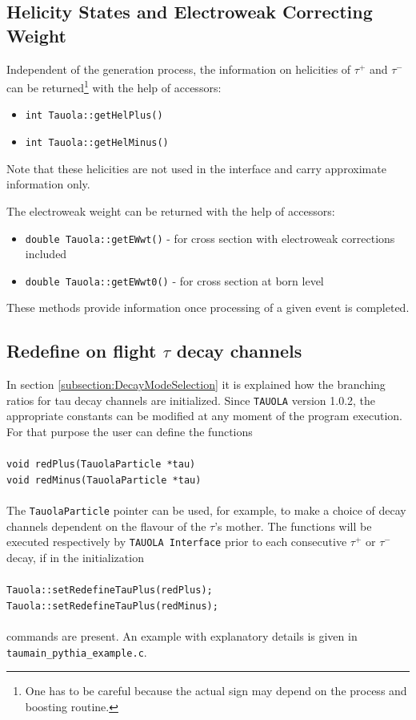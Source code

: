 \documentclass[]{Tauola_interface_design}
\begin{document}
\subsection{Helicity States and Electroweak Correcting Weight}
\label{subsection:eHelicity-ew}

Independent of the generation process,
the information on helicities of $\tau^+$ and $\tau^-$ 
can be returned\footnote{ One has to be careful because the actual sign may depend on the process
and boosting routine.}  with the help of accessors:

\begin{itemize}
  \item {\tt int Tauola::getHelPlus()}
  \item {\tt int Tauola::getHelMinus()}
\end{itemize}

Note that these helicities are not used in the interface and carry approximate information only.

The electroweak weight can be returned with the help of accessors:
\begin{itemize}
  \item {\tt double Tauola::getEWwt()} - for cross section with electroweak corrections included
  \item {\tt double Tauola::getEWwt0()} - for cross section at born level
\end{itemize}

These methods provide information once processing of a given event is completed.

\subsection{Redefine on flight  $\tau$ decay channels}
\label{subsection:redefine}
In section \ref{subsection:DecayModeSelection} it is explained how the branching ratios for
 tau decay channels are initialized.
Since {\tt TAUOLA} version 1.0.2, the appropriate constants
can be modified at any moment of the program execution.  For that purpose the user can define the functions
\\ \\
{\tt void redPlus(TauolaParticle *tau) } \\
{\tt void redMinus(TauolaParticle *tau) } \\
\\
The {\tt TauolaParticle} pointer can be used, for example, to make a choice of decay channels
dependent on the flavour of
the $\tau$'s mother.
The functions  will be executed respectively by {\tt TAUOLA Interface} prior to  each consecutive
$\tau^+$ or $\tau^-$ decay, if in the initialization 
\\ \\
{\tt Tauola::setRedefineTauPlus(redPlus); }\\
{\tt Tauola::setRedefineTauPlus(redMinus); }\\
\\
commands are present.
An example with explanatory details  is given in \\{\tt taumain\_pythia\_example.c}.
\end{document}

